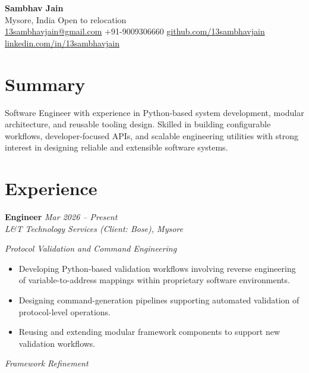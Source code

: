 \documentclass[a4paper,10pt]{article}
\begin{document}
\begin{center}
    {\LARGE \textbf{Sambhav Jain}} \\[2pt]
    Mysore, India \textbar{} Open to relocation \\[2pt]
    \href{mailto:13sambhavjain@gmail.com}{13sambhavjain@gmail.com} \quad
    +91-9009306660 \quad
    \href{https://github.com/13sambhavjain}{github.com/13sambhavjain} \quad
    \href{https://linkedin.com/in/13sambhavjain}{linkedin.com/in/13sambhavjain}
\end{center}

\section*{Summary}

Software Engineer with experience in Python-based system development, modular architecture, and reusable tooling design. Skilled in building configurable workflows, developer-focused APIs, and scalable engineering utilities with strong interest in designing reliable and extensible software systems.

\section*{Experience}

\noindent
\textbf{Engineer} \hfill \textit{Mar 2026 -- Present} \\
\textit{L\&T Technology Services (Client: Bose), Mysore}

\textit{Protocol Validation and Command Engineering}

\begin{itemize}

\item Developing Python-based validation workflows involving reverse engineering of variable-to-address mappings within proprietary software environments.

\item Designing command-generation pipelines supporting automated validation of protocol-level operations.

\item Reusing and extending modular framework components to support new validation workflows.

\end{itemize}

\textit{Framework Refinement}
\end{document}
